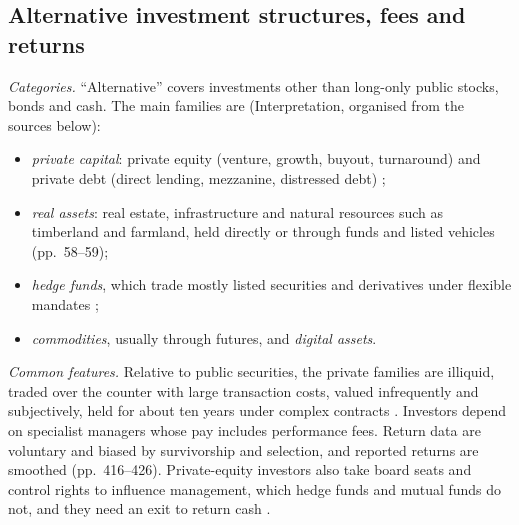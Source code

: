 \subsection{Alternative investment structures, fees and returns}

\begin{qfdefinition}\label{def:alternative-investment-categories}
 \emph{Categories.} ``Alternative'' covers investments other than long-only public stocks, bonds and cash. The main families are (Interpretation, organised from the sources below):
\begin{itemize}
\item \emph{private capital}: private equity (venture, growth, buyout, turnaround) and private debt (direct lending, mezzanine, distressed debt) \citep[pp.~58--60]{demaria-private-markets-2021};
\item \emph{real assets}: real estate, infrastructure and natural resources such as timberland and farmland, held directly or through funds and listed vehicles (pp.~58--59);
\item \emph{hedge funds}, which trade mostly listed securities and derivatives under flexible mandates \citep[pp.~559--562]{s7-ang};
\item \emph{commodities}, usually through futures, and \emph{digital assets}.
\end{itemize}

\emph{Common features.} Relative to public securities, the private families are illiquid, traded over the counter with large transaction costs, valued infrequently and subjectively, held for about ten years under complex contracts \citep[p.~594, Table~18.1]{s7-ang}. Investors depend on specialist managers whose pay includes performance fees. Return data are voluntary and biased by survivorship and selection, and reported returns are smoothed (pp.~416--426). Private-equity investors also take board seats and control rights to influence management, which hedge funds and mutual funds do not, and they need an exit to return cash \citep[pp.~5--7]{metrick-yasuda-survey-2011}.


\end{qfdefinition}

